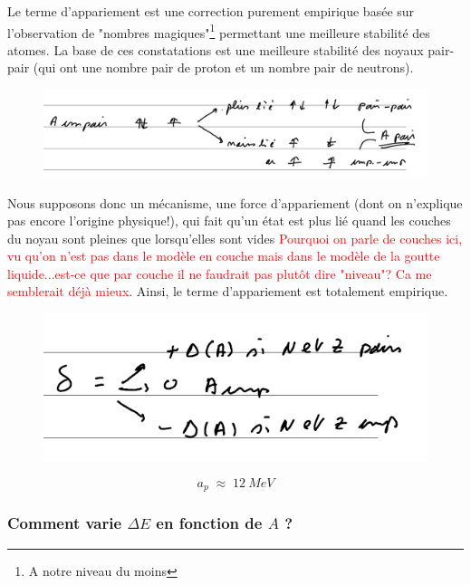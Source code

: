 Le terme d'appariement est une correction purement empirique basée sur l'observation de "nombres magiques"\footnote{A notre niveau du moins} permettant une meilleure stabilité des atomes. La base de ces constatations est une meilleure stabilité des noyaux pair-pair (qui ont une nombre pair de proton et un nombre pair de neutrons).\\
\begin{figure}[ht]
    \centering
    \includegraphics[width=\textwidth]{Images4/appariement.PNG}
\end{figure}

Nous supposons donc un mécanisme, une force d'appariement (dont on n'explique pas encore l'origine physique!), qui fait qu'un état est plus lié quand les couches du noyau sont pleines que lorsqu'elles sont vides \textcolor{red}{Pourquoi on parle de couches ici, vu qu'on n'est pas dans le modèle en couche mais dans le modèle de la goutte liquide...est-ce que par couche il ne faudrait pas plutôt dire "niveau"? Ca me semblerait déjà mieux}. Ainsi, le terme d'appariement est totalement empirique.\\
\begin{figure}[htp]
    \centering
    \includegraphics{Images4/appariement2.PNG}
\end{figure}
\[
    a_p \; \approx \; \SI{12}{MeV}
\]



\subsubsection{Comment varie $\Delta E$ en fonction de $A$ ?} 


